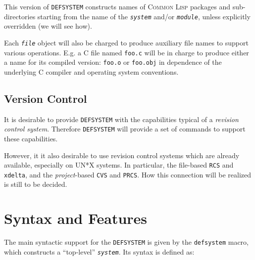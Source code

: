 \documentclass[a4paper]{article}
\newcommand{\CL}{\textsc{Common Lisp}}
\newcommand{\DEFSYSTEM}{\texttt{DEFSYSTEM}}
\newcommand{\code}[1]{\texttt{#1}}
\newcommand{\object}[1]{\texttt{\textit{#1}}} %
\begin{document}
This version of \DEFSYSTEM{} constructs names of \CL{} packages and
sub-directories starting from the name of the \object{system} and/or
\object{module}, unless explicitly overridden (we will see how).

Each \object{file} object will also be charged to produce auxiliary
file names to support various operations. E.g. a C file named
\code{foo.c} will be in charge to produce either a name for its
compiled version: \code{foo.o} or \code{foo.obj} in dependence of the
underlying C compiler and operating system conventions.

\subsection{Version Control}


It is desirable to provide \DEFSYSTEM{} with the capabilities typical
of a \emph{revision control system}. Therefore \DEFSYSTEM{} will
provide a set of commands to support these capabilities.

However, it it also desirable to use revision control systems which
are already available, especially on UN*X systems.  In particular, the
file-based \texttt{RCS} and \texttt{xdelta}, and the \emph{project}-based
\texttt{CVS} and \texttt{PRCS}. How this connection will be realized
is still to be decided.


\section{Syntax and Features}

The main syntactic support for the \DEFSYSTEM{} is given by the
\code{defsystem} macro, which constructs a ``top-level''
\object{system}. Its syntax is defined as:
\end{document}
